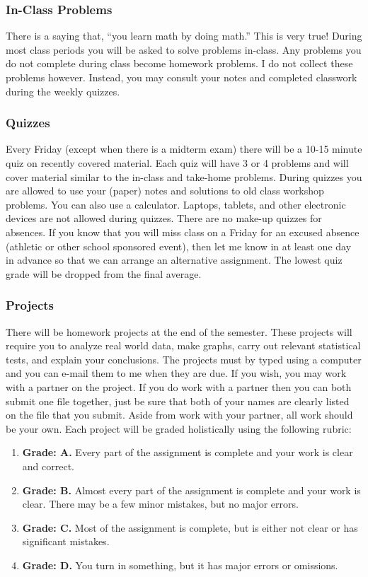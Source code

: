 \documentclass[10pt]{article}
\begin{document}
\subsubsection*{In-Class Problems}

There is a saying that, “you learn math by doing math.” This is very true! During most class periods you will be asked to solve problems in-class. Any problems you do not complete during class become homework problems. I do not collect these problems however. Instead, you may consult your notes and completed classwork during the weekly quizzes.


\subsubsection*{Quizzes}

Every Friday (except when there is a midterm exam) there will be a 10-15 minute quiz on recently covered material. Each quiz will have 3 or 4 problems and will cover material similar to the in-class and take-home problems. During quizzes you are allowed to use your (paper) notes and solutions to old class workshop problems. You can also use a calculator.  Laptops, tablets, and other electronic devices are not allowed during quizzes. There are no make-up quizzes for absences. If you know that you will miss class on a Friday for an excused absence (athletic or other school sponsored event), then let me know in at least one day in advance so that we can arrange an alternative assignment. The lowest quiz grade will be dropped from the final average.

\subsubsection*{Projects}

There will be homework projects at the end of the semester.  These projects will require you to analyze real world data, make graphs, carry out relevant statistical tests, and explain your conclusions.  The projects must by typed using a computer and you can e-mail them to me when they are due. If you wish, you may work with a partner on the project. If you do work with a partner then you can both submit one file together, just be sure that both of your names are clearly listed on the file that you submit.  Aside from work with your partner, all work should be your own. Each project will be graded holistically using the following rubric:

\begin{enumerate}
\item \textbf{Grade: A.} Every part of the assignment is complete and your work is clear and correct.  
\item \textbf{Grade: B.} Almost every part of the assignment is complete and your work is clear. There may be a few minor mistakes, but no major errors.  
\item \textbf{Grade: C.} Most of the assignment is complete, but is either not clear or has significant mistakes.
\item \textbf{Grade: D.} You turn in something, but it has major errors or omissions.  
\end{enumerate}
 
\end{document}
